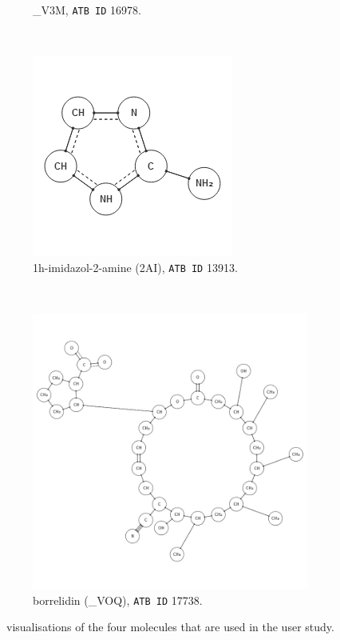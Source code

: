 \begin{figure}[h!]
\begin{subfigure}[t]{0.48\textwidth}
\caption{\_V3M, \texttt{ATB ID} 16978.}
\end{subfigure}%
\\[1em]
\begin{subfigure}[t]{0.48\textwidth}
\centering
\includegraphics[width=\textwidth]{img/13913.png}
\caption{1h-imidazol-2-amine (2AI), \texttt{ATB ID} 13913.}
\end{subfigure}%
~
\begin{subfigure}[t]{0.48\textwidth}
\centering
\includegraphics[width=\textwidth]{img/17738.png}
\caption{borrelidin (\_VOQ), \texttt{ATB ID} 17738.}
\end{subfigure}
\caption{\oframp\ visualisations of the four molecules that are used in the user study.}
\end{figure}

